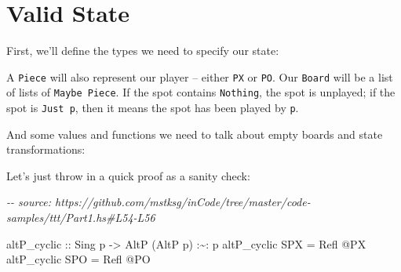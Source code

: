 \documentclass[]{article}
\newenvironment{Shaded}{}{}
\newcommand{\CommentTok}[1]{\textcolor[rgb]{0.38,0.63,0.69}{\textit{#1}}}
\newcommand{\DataTypeTok}[1]{\textcolor[rgb]{0.56,0.13,0.00}{#1}}
\newcommand{\NormalTok}[1]{#1}
\newcommand{\OperatorTok}[1]{\textcolor[rgb]{0.40,0.40,0.40}{#1}}
\newcommand{\OtherTok}[1]{\textcolor[rgb]{0.00,0.44,0.13}{#1}}
\begin{document}
\section{Valid State}\label{valid-state}

First, we'll define the types we need to specify our state:

\begin{Shaded}
\end{Shaded}

A \texttt{Piece} will also represent our player -- either \texttt{PX} or
\texttt{PO}. Our \texttt{Board} will be a list of lists of
\texttt{Maybe\ Piece}. If the spot contains \texttt{Nothing}, the spot is
unplayed; if the spot is \texttt{Just\ p}, then it means the spot has been
played by \texttt{p}.

And some values and functions we need to talk about empty boards and state
transformations:

\begin{Shaded}
\end{Shaded}

Let's just throw in a quick proof as a sanity check:

\begin{Shaded}
\begin{Highlighting}[]
\CommentTok{{-}{-} source: https://github.com/mstksg/inCode/tree/master/code{-}samples/ttt/Part1.hs\#L54{-}L56}

\OtherTok{altP\_cyclic ::} \DataTypeTok{Sing}\NormalTok{ p }\OtherTok{{-}\textgreater{}} \DataTypeTok{AltP}\NormalTok{ (}\DataTypeTok{AltP}\NormalTok{ p) }\OperatorTok{:\textasciitilde{}:}\NormalTok{ p}
\NormalTok{altP\_cyclic }\DataTypeTok{SPX} \OtherTok{=} \DataTypeTok{Refl} \OperatorTok{@}\DataTypeTok{\textquotesingle{}PX}
\NormalTok{altP\_cyclic }\DataTypeTok{SPO} \OtherTok{=} \DataTypeTok{Refl} \OperatorTok{@}\DataTypeTok{\textquotesingle{}PO}
\end{Highlighting}
\end{Shaded}
\end{document}
